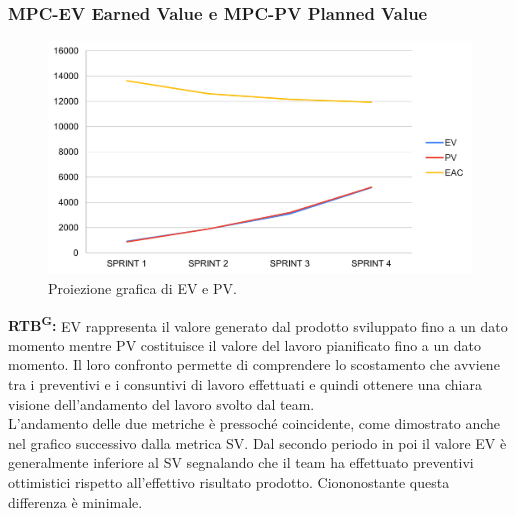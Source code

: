 \documentclass[8pt]{article}
\newcommand{\glossterm}[1]{#1\textsuperscript{G}} %
\begin{document}
\subsubsection{MPC-EV Earned Value e MPC-PV Planned Value}
\begin{figure}[h!]
    \centering
    \includegraphics[width=1\textwidth]{images/EV_PV.png}
    \caption{Proiezione grafica di EV e PV.}
    \label{fig:Proiezione grafica di EV e PV}
\end{figure}
\textbf{\glossterm{RTB}:} EV rappresenta il valore generato dal prodotto sviluppato fino a un dato momento mentre PV costituisce il valore del lavoro pianificato fino a un dato momento. Il loro confronto permette di comprendere lo scostamento che avviene tra i preventivi e i consuntivi di lavoro effettuati e quindi ottenere una chiara visione dell'andamento del lavoro svolto dal team.\\
L'andamento delle due metriche è pressoché coincidente, come dimostrato anche nel grafico successivo dalla metrica SV. Dal secondo periodo in poi il valore EV è generalmente inferiore al SV segnalando che il team ha effettuato preventivi ottimistici rispetto all'effettivo risultato prodotto. Ciononostante questa differenza è minimale.
\clearpage
\end{document}
